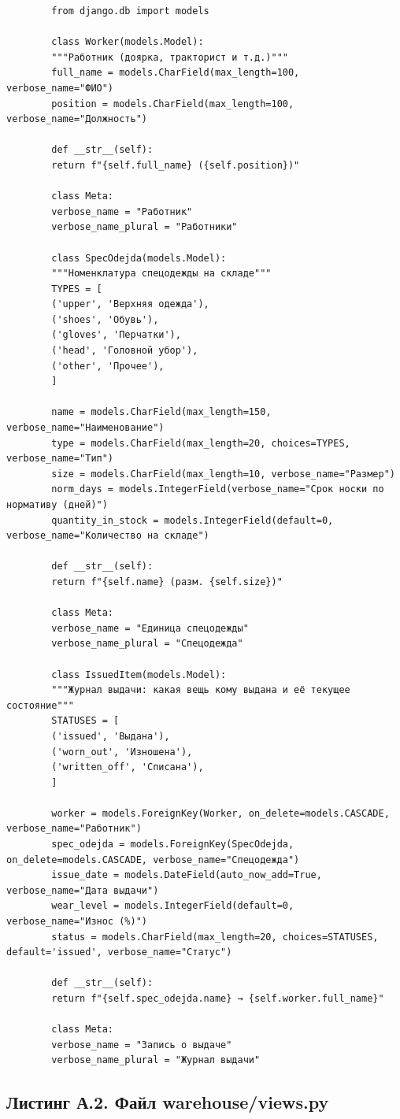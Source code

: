 \documentclass[14pt,a4paper]{extreport}
\begin{document}
\begin{singlespacing}
	\begin{lstlisting}
		from django.db import models
		
		class Worker(models.Model):
		"""Работник (доярка, тракторист и т.д.)"""
		full_name = models.CharField(max_length=100, verbose_name="ФИО")
		position = models.CharField(max_length=100, verbose_name="Должность")
		
		def __str__(self):
		return f"{self.full_name} ({self.position})"
		
		class Meta:
		verbose_name = "Работник"
		verbose_name_plural = "Работники"
		
		class SpecOdejda(models.Model):
		"""Номенклатура спецодежды на складе"""
		TYPES = [
		('upper', 'Верхняя одежда'),
		('shoes', 'Обувь'),
		('gloves', 'Перчатки'),
		('head', 'Головной убор'),
		('other', 'Прочее'),
		]
		
		name = models.CharField(max_length=150, verbose_name="Наименование")
		type = models.CharField(max_length=20, choices=TYPES, verbose_name="Тип")
		size = models.CharField(max_length=10, verbose_name="Размер")
		norm_days = models.IntegerField(verbose_name="Срок носки по нормативу (дней)")
		quantity_in_stock = models.IntegerField(default=0, verbose_name="Количество на складе")
		
		def __str__(self):
		return f"{self.name} (разм. {self.size})"
		
		class Meta:
		verbose_name = "Единица спецодежды"
		verbose_name_plural = "Спецодежда"
		
		class IssuedItem(models.Model):
		"""Журнал выдачи: какая вещь кому выдана и её текущее состояние"""
		STATUSES = [
		('issued', 'Выдана'),
		('worn_out', 'Изношена'),
		('written_off', 'Списана'),
		]
		
		worker = models.ForeignKey(Worker, on_delete=models.CASCADE, verbose_name="Работник")
		spec_odejda = models.ForeignKey(SpecOdejda, on_delete=models.CASCADE, verbose_name="Спецодежда")
		issue_date = models.DateField(auto_now_add=True, verbose_name="Дата выдачи")
		wear_level = models.IntegerField(default=0, verbose_name="Износ (%)")
		status = models.CharField(max_length=20, choices=STATUSES, default='issued', verbose_name="Статус")
		
		def __str__(self):
		return f"{self.spec_odejda.name} → {self.worker.full_name}"
		
		class Meta:
		verbose_name = "Запись о выдаче"
		verbose_name_plural = "Журнал выдачи"
	\end{lstlisting}
	
	\subsection*{Листинг А.2. Файл warehouse/views.py}
	

\end{singlespacing}
\end{document}
